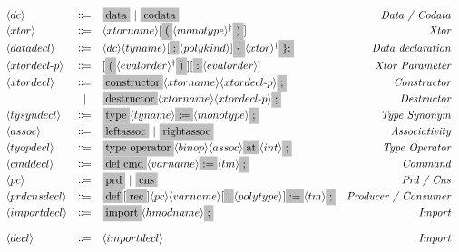 \documentclass[11pt]{article}
\newcommand{\nonterminal}[1]{\langle #1 \rangle}
\newcommand{\terminal}[1]{\colorbox{lightgray}{\vphantom{X}#1}}
\newcommand{\commalist}[1]{#1^{\dagger}}
\begin{document}
\[
  \begin{array}{lclr}
    \nonterminal{dc} & \Coloneqq & \terminal{data}\ |\ \terminal{codata} & \emph{Data / Codata} \\
    \nonterminal{xtor} & \Coloneqq & \nonterminal{xtorname}[\terminal{(}\commalist{\nonterminal{monotype}}\terminal{)}] & \emph{Xtor} \\
    \nonterminal{datadecl} & \Coloneqq & \nonterminal{dc} \nonterminal{tyname} [\terminal{:} \nonterminal{polykind}] \terminal{$\{$} \commalist{\nonterminal{xtor}}\terminal{$\};$} & \emph{Data declaration} \\
    \nonterminal{xtordecl$-$p} & \Coloneqq & [\terminal{(} \commalist{\nonterminal{evalorder}} \terminal{)}] [\terminal{:} \nonterminal{evalorder}] & \emph{Xtor Parameter} \\
    \nonterminal{xtordecl} & \Coloneqq & \terminal{constructor} \nonterminal{xtorname} \nonterminal{xtordecl$-$p}\terminal{;} & \emph{Constructor} \\
    & | & \terminal{destructor} \nonterminal{xtorname}\nonterminal{xtordecl$-$p} \terminal{;} & \emph{Destructor} \\
    \nonterminal{tysyndecl} & \Coloneqq & \terminal{type} \nonterminal{tyname} \terminal{$:=$} \nonterminal{monotype}\terminal{;} & \emph{Type Synonym} \\
    \nonterminal{assoc} & \Coloneqq & \terminal{leftassoc}\ |\ \terminal{rightassoc} & \emph{Associativity} \\
    \nonterminal{tyopdecl} & \Coloneqq & \terminal{type operator} \nonterminal{binop} \nonterminal{assoc} \terminal{at} \nonterminal{int} \terminal{;} & \emph{Type Operator} \\
    \nonterminal{cmddecl} & \Coloneqq & \terminal{def cmd} \nonterminal{varname} \terminal{$:=$} \nonterminal{tm} \terminal{;} & \emph{Command} \\
    \nonterminal{pc} & \Coloneqq & \terminal{prd}\ |\ \terminal{cns} & \emph{Prd / Cns} \\
    \nonterminal{prdcnsdecl} & \Coloneqq & \terminal{def} [\terminal{rec}] \nonterminal{pc} \nonterminal{varname} [\terminal{:} \nonterminal{polytype}] \terminal{$:=$} \nonterminal{tm} \terminal{;}& \emph{Producer / Consumer} \\
    \nonterminal{importdecl} & \Coloneqq & \terminal{import} \nonterminal{hmodname}\terminal{;} & \emph{Import} \\[4mm]
    \nonterminal{decl} & \Coloneqq & \nonterminal{importdecl}  & \emph{Import} \\

\end{array}\]
\end{document}
